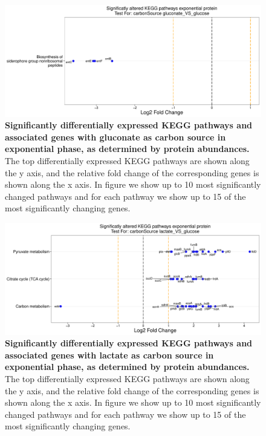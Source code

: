 \documentclass[a4paper]{article}
\begin{document}
\clearpage
\begin{figure}
	\includegraphics[width=1.0\textwidth]{../../d_figures/kegg_04.pdf}
	\caption[Significantly altered KEGG pathways for protein samples in exponential phase tested for gluconate against glucose]
	{\textbf{Significantly differentially expressed KEGG pathways and associated genes with gluconate as carbon source in exponential phase, as determined by protein abundances.} The top differentially expressed KEGG pathways are shown along the y axis, and the relative fold change of the corresponding genes is shown along the x axis. In figure we show up to 10 most significantly changed pathways and for each pathway we show up to 15 of the most significantly changing genes.}
\end{figure}

\clearpage
\begin{figure}
	\includegraphics[width=1.0\textwidth]{../../d_figures/kegg_05.pdf}
	\caption[Significantly altered KEGG pathways for protein samples in exponential phase tested for lactate against glucose]
	{\textbf{Significantly differentially expressed KEGG pathways and associated genes with lactate as carbon source in exponential phase, as determined by protein abundances.} The top differentially expressed KEGG pathways are shown along the y axis, and the relative fold change of the corresponding genes is shown along the x axis. In figure we show up to 10 most significantly changed pathways and for each pathway we show up to 15 of the most significantly changing genes.}
\end{figure}
\end{document}
